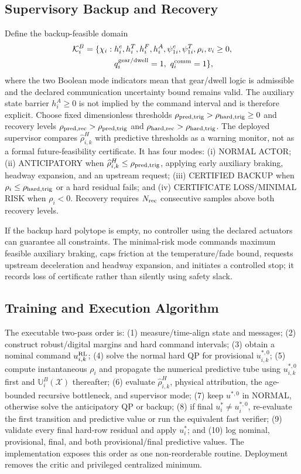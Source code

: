 \subsection{Supervisory Backup and Recovery}
Define the backup-feasible domain
\begin{equation}
\begin{split}
\mathcal K_i^B=\{\chi_i:\;&h_i^c,h_i^T,h_i^F,h_i^A,\psi_{1i}^c,\psi_{1i}^T,\rho_i,v_i\ge0,\\
&q_i^{\rm gear/dwell}=1,\ q_i^{\rm comm}=1\},
\end{split}\label{eq:backupdomain}
\end{equation}
where the two Boolean mode indicators mean that gear/dwell logic is admissible and the declared communication uncertainty bound remains valid. The auxiliary state barrier $h_i^A\ge0$ is not implied by the command interval and is therefore explicit. Choose fixed dimensionless thresholds $\rho_{\rm pred,trig}>\rho_{\rm hard,trig}\ge0$ and recovery levels $\rho_{\rm pred,rec}>\rho_{\rm pred,trig}$ and $\rho_{\rm hard,rec}>\rho_{\rm hard,trig}$. The deployed supervisor compares $\widehat{\rho}_{i,k}^{H}$ with predictive thresholds as a warning monitor, not as a formal future-feasibility certificate. It has four modes: (i) NORMAL ACTOR; (ii) ANTICIPATORY when $\widehat{\rho}_{i,k}^{H}\le\rho_{\rm pred,trig}$, applying early auxiliary braking, headway expansion, and an upstream request; (iii) CERTIFIED BACKUP when $\rho_i\le\rho_{\rm hard,trig}$ or a hard residual fails; and (iv) CERTIFICATE LOSS/MINIMAL RISK when $\rho_i<0$. Recovery requires $N_{\rm rec}$ consecutive samples above both recovery levels.

If the backup hard polytope is empty, no controller using the declared actuators can guarantee all constraints. The minimal-risk mode commands maximum feasible auxiliary braking, caps friction at the temperature/fade bound, requests upstream deceleration and headway expansion, and initiates a controlled stop; it records loss of certificate rather than silently using safety slack.

\subsection{Training and Execution Algorithm}
The executable two-pass order is: (1) measure/time-align state and messages; (2) construct robust/digital margins and hard command intervals; (3) obtain a nominal command $u_{i,k}^{\rm RL}$; (4) solve the normal hard QP for provisional $u_{i,k}^{*,0}$; (5) compute instantaneous $\rho_i$ and propagate the numerical predictive tube using $u_{i,k}^{*,0}$ first and $\mathbb U_i^B(\mathcal X)$ thereafter; (6) evaluate $\widehat{\rho}_{i,k}^{H}$, physical attribution, the age-bounded recursive bottleneck, and supervisor mode; (7) keep $u^{*,0}$ in NORMAL, otherwise solve the anticipatory QP or backup; (8) if final $u_i^*\ne u_i^{*,0}$, re-evaluate the first transition and predictive value or run the equivalent fast verifier; (9) validate every final hard-row residual and apply $u_i^*$; and (10) log nominal, provisional, final, and both provisional/final predictive values. The implementation exposes this order as one non-reorderable routine. Deployment removes the critic and privileged centralized minimum.
